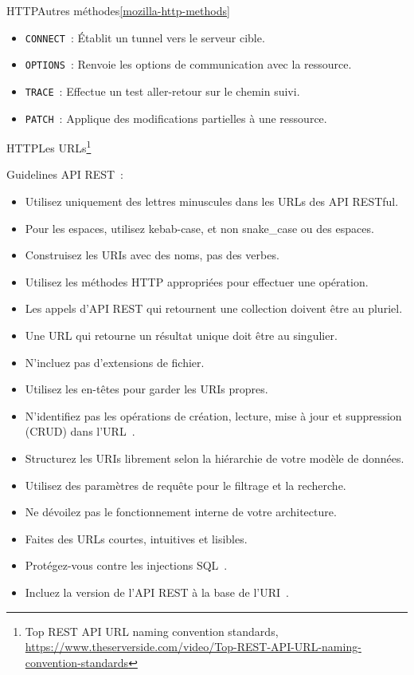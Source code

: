 \documentclass{beamer}
\begin{document}
    \begin{frame}{HTTP}{Autres méthodes\cref{mozilla-http-methods}}
        \begin{itemize}
            \item \lstinline{CONNECT}~: Établit un tunnel vers le serveur cible.
            \item \lstinline{OPTIONS}~: Renvoie les options de communication avec la ressource.
            \item \lstinline{TRACE}~: Effectue un test aller-retour sur le chemin suivi.
            \item \lstinline{PATCH}~: Applique des modifications partielles à une ressource.
        \end{itemize}
    \end{frame}

    \begin{frame}{HTTP}{Les URLs\footnote{Top REST API URL naming convention standards, \url{https://www.theserverside.com/video/Top-REST-API-URL-naming-convention-standards}}}
        \begin{tiny}
            Guidelines API REST~:
            \begin{itemize}
                \item Utilisez uniquement des lettres minuscules dans les URLs des API RESTful.
                \item Pour les espaces, utilisez kebab-case, et non snake\_case ou des espaces.
                \item Construisez les URIs avec des noms, pas des verbes.
                \item Utilisez les méthodes HTTP appropriées pour effectuer une opération.
                \item Les appels d'API REST qui retournent une collection doivent être au pluriel.
                \item Une URL qui retourne un résultat unique doit être au singulier.
                \item N'incluez pas d'extensions de fichier.
                \item Utilisez les en-têtes pour garder les URIs propres.
                \item N'identifiez pas les opérations de création, lecture, mise à jour et suppression (CRUD) dans l'URL~.
                \item Structurez les URIs librement selon la hiérarchie de votre modèle de données.
                \item Utilisez des paramètres de requête pour le filtrage et la recherche.
                \item Ne dévoilez pas le fonctionnement interne de votre architecture.
                \item Faites des URLs courtes, intuitives et lisibles.
                \item Protégez-vous contre les injections SQL~.
                \item Incluez la version de l'API REST à la base de l'URI~.
            \end{itemize}
        \end{tiny}
    \end{frame}
\end{document}
